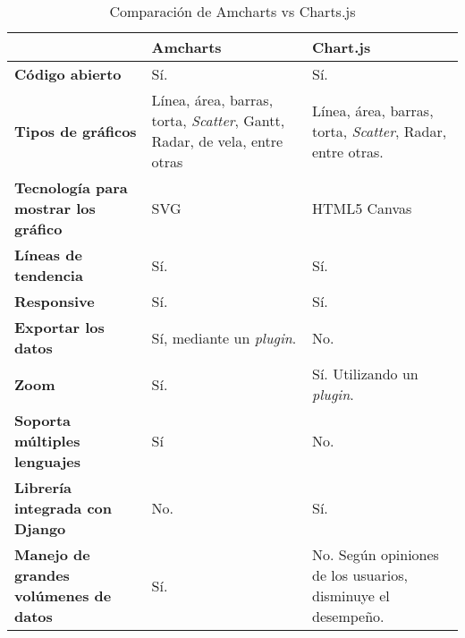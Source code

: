 \begin{table}[h]
\centering
\caption{Comparación de Amcharts vs Charts.js}
\label{tabla:6.2}
\begin{tabular}{| p{} | p{} | p{} |}
\hline
                                              & \textbf{Amcharts}                                                       & \textbf{Chart.js}                                            \\ \hline
\textbf{Código abierto}                       & Sí.                                                                     & Sí.                                                          \\ \hline
\textbf{Tipos de gráficos}                    & Línea, área, barras, torta, \textit{Scatter}, Gantt, Radar, de vela, entre otras & Línea, área, barras, torta, \textit{Scatter}, Radar, entre otras.     \\ \hline
\textbf{Tecnología para mostrar los gráfico}  & SVG                                                                     & HTML5 Canvas                                                 \\ \hline
\textbf{Líneas de tendencia}                  & Sí.                                                                     & Sí.                                                          \\ \hline
\textbf{Responsive}                           & Sí.                                                                     & Sí.                                                          \\ \hline
\textbf{Exportar los datos}                   & Sí, mediante un \textit{plugin}.                                                 & No.                                                          \\ \hline
\textbf{Zoom}                                 & Sí.                                                                     & Sí. Utilizando un \textit{plugin}.                                    \\ \hline
\textbf{Soporta múltiples lenguajes}          & Sí                                                                      & No.                                                          \\ \hline
\textbf{Librería integrada con Django}        & No.                                                                     & Sí.                                                          \\ \hline
\textbf{Manejo de grandes volúmenes de datos} & Sí.                                                                     & No. Según opiniones de los usuarios, disminuye el desempeño. \\ \hline
\end{tabular}
\end{table}

